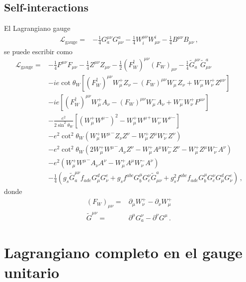 \subsection{Self-interactions}

\begin{frame}
El Lagrangiano gauge
\begin{align}
  \mathcal{L}_{\text{gauge}}=& -\tfrac{1}{4}G^{\mu\nu}_a G_{\mu\nu}^a-\tfrac{1}{4}W^{\mu\nu}_i W_{\mu\nu}^i-\tfrac{1}{4}B^{\mu\nu} B_{\mu\nu}\,,
\end{align}
se puede escribir como
\begin{align}
\label{eq:lgaguefin}
\mathcal{L}_{\text{gauge}}=&  -\tfrac{1}{4}F^{\mu\nu} F_{\mu\nu}-\tfrac{1}{4}Z^{\mu\nu} Z_{\mu\nu}-\tfrac{1}{2}(F_W^\dagger)^{\mu\nu} (F_W)_{\mu\nu}
- \tfrac{1}{4}\widetilde{G}^{\mu\nu}_a \widetilde{G}_{\mu\nu}^a\nonumber\\
&-ie\cot\theta_W\left[(F_W^\dagger)^{\mu\nu}W_\mu^+ Z_\nu-(F_W)^{\mu\nu}W_\mu^- Z_\nu+W_\mu^-W_\nu^+Z^{\mu\nu}\right]\nonumber\\
&-ie\left[(F_W^\dagger)^{\mu\nu}W_\mu^+ A_\nu-(F_W)^{\mu\nu}W_\mu^- A_\nu+W_\mu^-W_\nu^+F^{\mu\nu}\right]\nonumber\\
&-\frac{e^2}{2\sin^2\theta_W}\left[\left(W_\mu^+{W^\mu}^-\right)^2-W_\mu^+{W^\mu}^+W_\nu^-{W^\nu}^-\right] \nonumber\\
&-e^2\cot^2\theta_W\left(W_\mu^+{W^\mu}^-Z_\nu Z^\nu-W_\mu^+Z^\mu W_\nu^-Z^\nu\right)\nonumber\\
&-e^2\cot^2\theta_W\left(2W_\mu^+{W^\mu}^-A_\nu Z^\nu-W_\mu^+A^\mu W_\nu^-Z^\nu-W_\mu^+Z^\mu W_\nu^-A^\nu\right)\nonumber\\
&-e^2\left(W_\mu^+{W^\mu}^-A_\nu A^\nu-W_\mu^+A^\mu W_\nu^-A^\nu\right)\nonumber\\
&- \frac{1}{4}\left(g_s\widetilde{G}^{\mu\nu}_af_{a d e}G^d_\mu G^e_\nu
    +g_sf^{a b c}G_b^\mu G_c^\nu\widetilde{G}_{\mu\nu}^a
    +g_s^2f^{a b c}f_{a d e}G_b^\mu G_c^\nu G^d_\mu G^e_\nu\right)\,,
\end{align}
donde
\begin{align}
  (F_W)_{\mu\nu}=&\partial_\mu W^+_\nu-\partial_\nu W^+_\mu\nonumber\\
  \widetilde{G}^{\mu\nu}=&\partial^\mu G^\nu_a-\partial^\nu G^\mu\,.
\end{align}

\end{frame}

\section{Lagrangiano completo en el gauge unitario}

